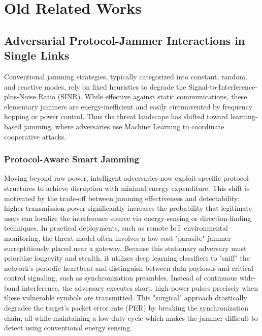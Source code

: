 \documentclass[conference]{IEEEtran}
\newcommand{\adm}[1]{{\color{orange}{[#1]}}}
\begin{document}
\section{Old Related Works}
\subsection{Adversarial Protocol-Jammer Interactions in Single Links}
Conventional jamming strategies, typically categorized into constant, random, and reactive modes, rely on fixed heuristics to degrade the Signal-to-Interference-plus-Noise Ratio (SINR). 
While effective against static communications, these elementary jammers are energy-inefficient and easily circumvented by frequency hopping or power control. 
Thus the threat landscape has shifted toward learning-based jamming, where adversaries use Machine Learning to coordinate cooperative attacks.~\cite{jamming_survey_2024}

\subsubsection{Protocol-Aware Smart Jamming}
Moving beyond raw power, intelligent adversaries now exploit specific protocol structures to achieve disruption with minimal energy expenditure.
This shift is motivated by the trade-off between jamming effectiveness and detectability: higher transmission power significantly increases the probability that legitimate users can localize the interference source via energy-sensing or direction-finding techniques. 
In practical deployments, such as remote IoT environmental monitoring, the threat model often involves a low-cost "parasite" jammer surreptitiously placed near a gateway.
Because this stationary adversary must prioritize longevity and stealth, it utilizes deep learning classifiers to "sniff" the network’s periodic heartbeat and distinguish between data payloads and critical control signaling, such as synchronization preambles.
Instead of continuous wide-band interference, the adversary executes short, high-power pulses precisely when these vulnerable symbols are transmitted. 
This "surgical" approach drastically degrades the target's packet error rate (PER) by breaking the synchronization chain, all while maintaining a low duty cycle which makes the jammer difficult to detect using conventional energy sensing.
\end{document}
